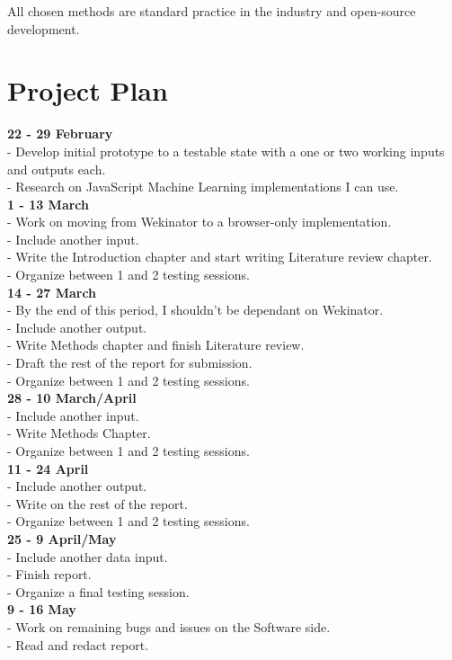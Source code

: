 \documentclass[a4paper, 11pt]{article}
\begin{document}
  All chosen methods are standard practice in the industry and open-source development.

  \section{Project Plan}
  \textbf{22 - 29 February} \\
  - Develop initial prototype to a testable state with a one or two working inputs and outputs each. \\
  - Research on JavaScript Machine Learning implementations I can use. \\
  \textbf{1 - 13 March} \\
  - Work on moving from Wekinator to a browser-only implementation. \\
  - Include another input. \\
  - Write the Introduction chapter and start writing Literature review chapter. \\
  - Organize between 1 and 2 testing sessions. \\
  \textbf{14 - 27 March} \\
  - By the end of this period, I shouldn't be dependant on Wekinator. \\
  - Include another output. \\
  - Write Methods chapter and finish Literature review. \\
  - Draft the rest of the report for submission. \\
  - Organize between 1 and 2 testing sessions. \\
  \textbf{28 - 10 March/April} \\
  - Include another input. \\
  - Write Methods Chapter. \\
  - Organize between 1 and 2 testing sessions. \\
  \textbf{11 - 24 April} \\
  - Include another output. \\
  - Write on the rest of the report. \\
  - Organize between 1 and 2 testing sessions. \\
  \textbf{25 - 9 April/May} \\
  - Include another data input. \\
  - Finish report. \\
  - Organize a final testing session. \\
  \textbf{9 - 16 May} \\
  - Work on remaining bugs and issues on the Software side. \\
  - Read and redact report. \\
\end{document}
